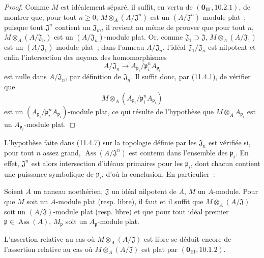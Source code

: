 \begin{proof}
Comme $M$ est idéalement séparé, il suffit, en vertu de
$(\mathbf 0_{\mathrm{III}},10.2.1)$, de montrer que, pour tout $n\geq0$,
$M\otimes_A(A/\mathfrak J^n)$ est un $(A/\mathfrak J^n)$-module plat~;
puisque tout $\mathfrak J^n$ contient un $\mathfrak J_m$, il revient au même
de prouver que pour tout $n$, $M\otimes_A(A/\mathfrak J_n)$ est un
$(A/\mathfrak J_n)$-module plat. Or, comme
$\mathfrak J_1\supset\mathfrak J$, $M\otimes_A(A/\mathfrak J_1)$ est un
$(A/\mathfrak J_1)$-module plat~; dans l'anneau $A/\mathfrak J_n$, l'idéal
$\mathfrak J_1/\mathfrak J_n$ est nilpotent et enfin l'intersection des noyaux
des homomorphismes
\[
A/\mathfrak J_n\longrightarrow
A_{\mathfrak p_i}/\mathfrak p_i^nA_{\mathfrak p_i}
\]
est nulle dans $A/\mathfrak J_n$, par définition de $\mathfrak J_n$. Il suffit
donc, par (11.4.1), de vérifier que
\[
M\otimes_A(A_{\mathfrak p_i}/\mathfrak p_i^nA_{\mathfrak p_i})
\]
est un $(A_{\mathfrak p_i}/\mathfrak p_i^nA_{\mathfrak p_i})$-module plat, ce
qui résulte de l'hypothèse que $M\otimes_AA_{\mathfrak p_i}$ est un
$A_{\mathfrak p_i}$-module plat.
\end{proof}

\begin{remark}[11.4.8]
\label{IV.11.4.8-fr}
L'hypothèse faite dans (11.4.7) sur la topologie définie par les
$\mathfrak J_n$ est vérifiée si, pour tout $n$ assez grand,
$\operatorname{Ass}(A/\mathfrak J^n)$ est contenu dans l'ensemble des
$\mathfrak p_i$. En effet, $\mathfrak J^n$ est alors intersection d'idéaux
primaires pour les $\mathfrak p_i$, dont chacun contient une puissance
symbolique de $\mathfrak p_i$, d'où la conclusion. En particulier~:
\end{remark}

\begin{corollary}[11.4.9]
\label{IV.11.4.9-fr}
Soient $A$ un anneau noethérien, $\mathfrak J$ un idéal nilpotent de $A$, $M$
un $A$-module. Pour que $M$ soit un $A$-module plat (resp. libre), il faut et
il suffit que $M\otimes_A(A/\mathfrak J)$ soit un $(A/\mathfrak J)$-module
plat (resp. libre) et que pour tout idéal premier
$\mathfrak p\in\operatorname{Ass}(A)$, $M_\mathfrak p$ soit un
$A_\mathfrak p$-module plat.
\end{corollary}


L'assertion relative au cas où $M\otimes_A(A/\mathfrak J)$ est libre se déduit
encore de l'assertion relative au cas où $M\otimes_A(A/\mathfrak J)$ est plat
par $(\mathbf 0_{\mathrm{III}},10.1.2)$.

